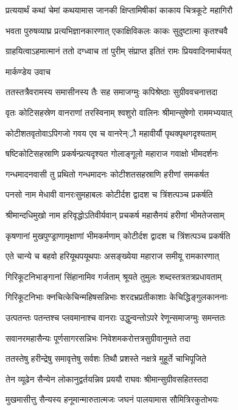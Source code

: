\twolineshloka
{प्रत्ययार्थं कथां चेमां कथयामास जानकी}
{क्षिप्तामिषीकां काकाय चित्रकूटे महागिरौ}


\twolineshloka
{भवता पुरुषव्याघ्र प्रत्यभिज्ञानकारणात्}
{एकाक्षिविकलः काकः सुदुष्टात्मा कृतश्चवै}


\twolineshloka
{ग्राहयित्वाऽहमात्मानं ततो दग्ध्वाच तां पुरीम्}
{संप्राप्त इतितं रामः प्रियवादिनमार्चयत्}


\twolineshloka
{मार्कण्डेय उवाच}
{}


\twolineshloka
{ततस्तत्रैवरामस्य समासीनस्य तैः सह}
{समाजग्मुः कपिश्रेष्ठाः सुग्रीववचनात्तदा}


\twolineshloka
{वृतः कोटिसहस्रेण वानराणां तरस्विनाम्}
{श्वशुरो वालिनः श्रीमान्सुषेणो राममभ्ययात्}


\twolineshloka
{कोटीशतवृतोवाऽपिगजो गवय एव च}
{वानरेन््रौ महावीर्यौ पृथक्पृथगदृश्यताम्}


\twolineshloka
{षष्टिकोटिसहस्राणि प्रकर्षन्प्रत्यदृश्यत}
{गोलाङ्गूलो महाराज गवाक्षो भीमदर्शनः}


\twolineshloka
{गन्धमादनवासी तु प्रथितो गन्धमादनः}
{कोटीशतसहस्राणि हरीणां समकर्षत}


\twolineshloka
{पनसो नाम मेधावी वानरःसुमहाबलः}
{कोटीर्दश द्वादश च त्रिंशत्पञ्च प्रकर्षति}


\twolineshloka
{श्रीमान्दधिमुखो नाम हरिवृद्धोऽतिवीर्यवान्}
{प्रचकर्ष महासैनयं हरीणां भीमतेजसाम्}


\twolineshloka
{कृषणानां मुखपुण्ड्राणामृक्षाणां भीमकर्मणाम्}
{कोटीर्दश द्वादश च त्रिंशत्पञ्च प्रकर्षति}


\twolineshloka
{एते चान्ये च बहवो हरियूथपयूथपाः}
{असङ्ख्येया महाराज समीयू रामकारणात्}


\twolineshloka
{गिरिकूटनिभाङ्गानां सिंहानामिव गर्जताम्}
{श्रूयते तुमुलः शब्दस्तत्रतत्रप्रधावताम्}


\twolineshloka
{गिरिकूटनिभाः क्नचित्केचिन्महिषसन्निभाः}
{शरदभ्रप्रतीकाशाः केचिद्धिङ्गुलकाननाः}


\twolineshloka
{उत्पतन्तः पतन्तश्च प्लवमानाश्च वानराः}
{उद्धुन्वन्तोऽपरे रेणून्समाजग्मुः समन्ततः}


\twolineshloka
{सवानरमहासैन्यः पूर्णसागरसन्निभः}
{निवेशमकरोत्तत्रसुग्रीवानुमते तदा}


\twolineshloka
{ततस्तेषु हरीन्द्रेषु समावृत्तेषु सर्वशः}
{तिथौ प्रशस्ते नक्षत्रे मुहूर्ते चाभिपूजिते}


\twolineshloka
{तेन व्यूढेन सैन्येन लोकानुद्वर्तयन्निव}
{प्रययौ राघवः श्रीमान्सुग्रीवसहितस्तदा}


\twolineshloka
{मुखमासीत्तु सैन्यस्य हनूमान्मारुतात्मजः}
{जघनं पालयामास सौमित्रिरकुतोभयः}


